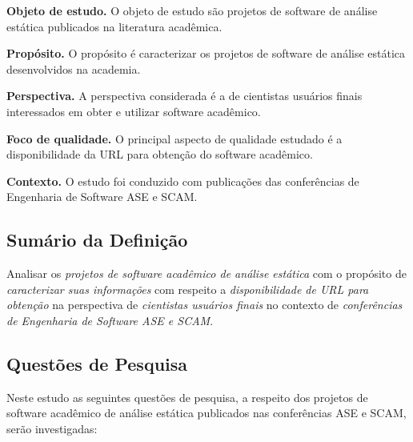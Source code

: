 \begin{description}
\item{\bf Objeto de estudo.} 
O objeto de estudo são projetos de software de análise estática publicados na literatura acadêmica.

\item{\bf Propósito.} 
O propósito é caracterizar os projetos de software de análise estática desenvolvidos na academia.


\item{\bf Perspectiva.} 
A perspectiva considerada é a de cientistas usuários finais interessados em obter e utilizar software acadêmico.

\item{\bf Foco de qualidade.} 
O principal aspecto de qualidade estudado é a disponibilidade da URL para obtenção do software acadêmico.

\item{\bf Contexto.} 
O estudo foi conduzido com publicações das conferências de Engenharia de Software ASE e SCAM.

\end{description}

\subsection{Sumário da Definição}


Analisar os \textit{projetos de software acadêmico de análise estática} %
com o propósito de \textit{caracterizar suas informações} %
com respeito a \textit{disponibilidade de URL para obtenção} %
na perspectiva de \textit{cientistas usuários finais} %
no contexto de \textit{conferências de Engenharia de Software ASE e SCAM}. %

\subsection{Questões de Pesquisa}

Neste estudo as seguintes questões de pesquisa, a respeito
dos projetos de software acadêmico de análise estática publicados nas conferências ASE e SCAM,
serão investigadas:

\newcommand{\EstudoUmQuestaoUm}{
  Quais são os projetos de software acadêmico de análise estática publicados
  com identificação de nome e URL?
}
\newcommand{\EstudoUmQuestaoDois}{
  Quantos projetos de software acadêmico de análise estática estão disponíveis
  para obtenção hoje?
}
\newcommand{\EstudoUmQuestaoTres}{
  Os projetos de software acadêmico de análise estática aceitam explicitamente
  contribuição via código fonte?
}


